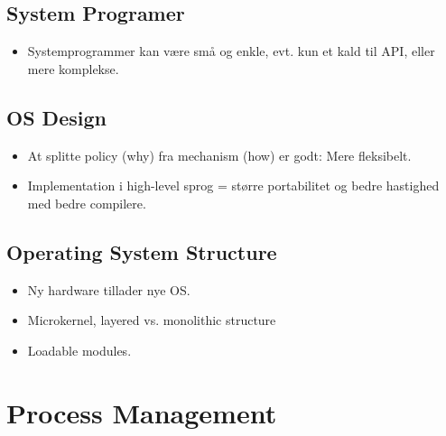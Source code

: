 \documentclass[a4wide,10pt]{article}
\begin{document}
\subsection{System Programer} %
\label{sub:2_5}
\begin{itemize}
	\item Systemprogrammer kan være små og enkle, evt. kun et kald til API, eller mere komplekse.
\end{itemize}

\subsection{OS Design} %
\label{sub:2_6}
\begin{itemize}
	\item At splitte policy (why) fra mechanism (how) er godt: Mere fleksibelt.
	\item Implementation i high-level sprog = større portabilitet og bedre hastighed med bedre compilere.
\end{itemize}

\subsection{Operating System Structure} %
\label{sub:2_7}
\begin{itemize}
	\item Ny hardware tillader nye OS.
	\item Microkernel, layered vs. monolithic structure
	\item Loadable modules.
\end{itemize}

\section{Process Management} %
\label{sec:kapitel_3}
\end{document}
